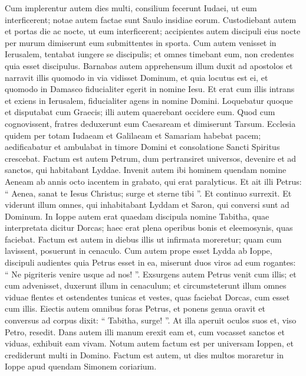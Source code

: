 \begin{biblechapter}
\begin{biblechapter}
\begin{biblechapter}
\begin{biblechapter}
\begin{biblechapter}
\begin{biblechapter}
\begin{biblechapter}
\begin{biblechapter}
\begin{biblechapter}
\verse Cum implerentur autem dies multi, consilium fecerunt Iudaei, ut eum interficerent; 
\verse notae autem factae sunt Saulo insidiae eorum. Custodiebant autem et portas die ac nocte, ut eum interficerent; 
\verse accipientes autem discipuli eius nocte per murum dimiserunt eum submittentes in sporta.
 \verse Cum autem venisset in Ierusalem, tentabat iungere se discipulis; et omnes timebant eum, non credentes quia esset discipulus. 
\verse Barnabas autem apprehensum illum duxit ad apostolos et narravit illis quomodo in via vidisset Dominum, et quia locutus est ei, et quomodo in Damasco fiducialiter egerit in nomine Iesu. 
\verse Et erat cum illis intrans et exiens in Ierusalem, fiducialiter agens in nomine Domini. 
\verse Loquebatur quoque et disputabat cum Graecis; illi autem quaerebant occidere eum. 
\verse Quod cum cognovissent, fratres deduxerunt eum Caesaream et dimiserunt Tarsum.
 \verse Ecclesia quidem per totam Iudaeam et Galilaeam et Samariam habebat pacem; aedificabatur et ambulabat in timore Domini et consolatione Sancti Spiritus crescebat.
 \verse Factum est autem Petrum, dum pertransiret universos, devenire et ad sanctos, qui habitabant Lyddae. 
\verse Invenit autem ibi hominem quendam nomine Aeneam ab annis octo iacentem in grabato, qui erat paralyticus. 
\verse Et ait illi Petrus: “ Aenea, sanat te Iesus Christus; surge et sterne tibi ”. Et continuo surrexit. 
\verse Et viderunt illum omnes, qui inhabitabant Lyddam et Saron, qui conversi sunt ad Dominum.
 \verse In Ioppe autem erat quaedam discipula nomine Tabitha, quae interpretata dicitur Dorcas; haec erat plena operibus bonis et eleemosynis, quas faciebat. 
 \verse Factum est autem in diebus illis ut infirmata moreretur; quam cum lavissent, posuerunt in cenaculo. 
\verse Cum autem prope esset Lydda ab Ioppe, discipuli audientes quia Petrus esset in ea, miserunt duos viros ad eum rogantes: “ Ne pigriteris venire usque ad nos! ”. 
\verse Exsurgens autem Petrus venit cum illis; et cum advenisset, duxerunt illum in cenaculum; et circumsteterunt illum omnes viduae flentes et ostendentes tunicas et vestes, quas faciebat Dorcas, cum esset cum illis. 
\verse Eiectis autem omnibus foras Petrus, et ponens genua oravit et conversus ad corpus dixit: “ Tabitha, surge! ”. At illa aperuit oculos suos et, viso Petro, resedit. 
\verse Dans autem illi manum erexit eam et, cum vocasset sanctos et viduas, exhibuit eam vivam.
 \verse Notum autem factum est per universam Ioppen, et crediderunt multi in Domino. 
\verse Factum est autem, ut dies multos moraretur in Ioppe apud quendam Simonem coriarium.
 

\end{biblechapter}
\end{biblechapter}
\end{biblechapter}
\end{biblechapter}
\end{biblechapter}
\end{biblechapter}
\end{biblechapter}
\end{biblechapter}
\end{biblechapter}
